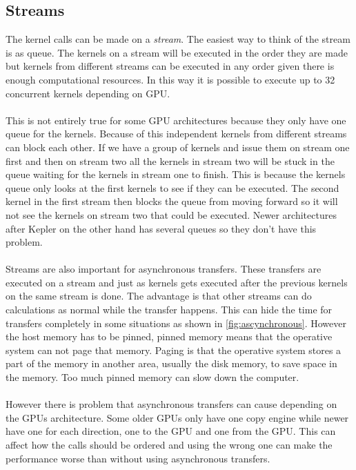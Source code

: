\documentclass[10pt,a4paper]{report}
\begin{document}
\subsection{Streams}
\label{streams}
The kernel calls can be made on a \emph{stream}. The easiest way to think of the stream is as queue. The kernels on a stream will be executed in the order they are made but kernels from different streams can be executed in any order given there is enough computational resources. In this way it is possible to execute up to 32 concurrent kernels depending on GPU.\cite{cuda}\\
\\
This is not entirely true for some GPU architectures because they only have one queue for the kernels. Because of this independent kernels from different streams can block each other. If we have a group of kernels and issue them on stream one first and then on stream two all the kernels in stream two will be stuck in the queue waiting for the kernels in stream one to finish. This is because the kernels queue only looks at the first kernels to see if they can be executed. The second kernel in the first stream then blocks the queue from moving forward so it will not see the kernels on stream two that could be executed. Newer architectures after Kepler on the other hand has several queues so they don't have this problem.\cite{cuda, cuda_best_practice, kepler_tuning_guide}\\
\\
Streams are also important for asynchronous transfers. These transfers are executed on a stream and just as kernels gets executed after the previous kernels on the same stream is done. The advantage is that other streams can do calculations as normal while the transfer happens. This can hide the time for transfers completely in some situations as shown in \ref{fig:ascynchronous}. However the host memory has to be pinned, pinned memory means that the operative system can not page that memory. Paging is that the operative system stores a part of the memory in another area, usually the disk memory, to save space in the memory. Too much pinned memory can slow down the computer.\cite{cuda, overlap_transfers_cuda}\\
\\
However there is problem that asynchronous transfers can cause depending on the GPUs architecture\cite{overlap_transfers_cuda, cuda_fortran_overlap}. Some older GPUs only have one copy engine while newer have one for each direction, one to the GPU and one from the GPU\cite{overlap_transfers_cuda, cuda_fortran_overlap}. This can affect how the calls should be ordered and using the wrong one can make the performance worse than without using asynchronous transfers\cite{overlap_transfers_cuda, cuda_fortran_overlap}.\\
\end{document}
